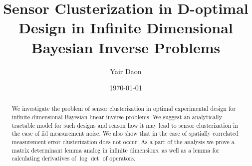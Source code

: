\documentclass{amsart}
\numberwithin{equation}{section}
\providecommand{\DIFadd}[1]{{\protect\color{blue}\uwave{#1}}} %
\providecommand{\DIFaddbegin}{} %
\providecommand{\DIFaddend}{} %
\providecommand{\DIFdelbegin}{} %
\providecommand{\DIFdelend}{} %
\begin{document}
\title[Sensor Clusterization in D-optimal design in infinite
  dimensions]{Sensor Clusterization in D-optimal Design in Infinite
  Dimensional \DIFaddbegin \DIFadd{Linear }\DIFaddend Bayesian Inverse Problems}

\author{Yair Daon}
\address{Porter School of the Environment and Earth
  Sciences, Tel Aviv University\\ Tel Aviv, Israel}

\date{\today}

\DIFdelbegin %
\DIFdelend \DIFaddbegin \begin{abstract}
  We investigate the problem of sensor clusterization in optimal
  experimental design for infinite-dimensional Bayesian
  linear inverse problems. We suggest an analytically
  tractable model for such designs and reason how it may lead to
  sensor clusterization in the case of iid measurement noise. We also
  show that in the case of spatially correlated measurement error
  clusterization does not occur. As a part of the analysis we prove a
  matrix determinant lemma analog in infinite dimensions, as well as a
  lemma for calculating derivatives of $\log \det$ of operators.
\end{abstract}
\DIFaddend 
\end{document}
